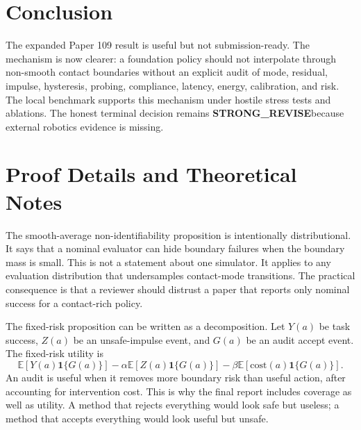 \documentclass{article}
\newcommand{\terminal}{\textbf{STRONG\_REVISE}}
\begin{document}
\section{Conclusion}
The expanded Paper 109 result is useful but not submission-ready. The mechanism is now clearer: a foundation policy should not interpolate through non-smooth contact boundaries without an explicit audit of mode, residual, impulse, hysteresis, probing, compliance, latency, energy, calibration, and risk. The local benchmark supports this mechanism under hostile stress tests and ablations. The honest terminal decision remains \terminal because external robotics evidence is missing.

\clearpage
\appendix
\section{Proof Details and Theoretical Notes}
The smooth-average non-identifiability proposition is intentionally distributional. It says that a nominal evaluator can hide boundary failures when the boundary mass is small. This is not a statement about one simulator. It applies to any evaluation distribution that undersamples contact-mode transitions. The practical consequence is that a reviewer should distrust a paper that reports only nominal success for a contact-rich policy.

The fixed-risk proposition can be written as a decomposition. Let $Y(a)$ be task success, $Z(a)$ be an unsafe-impulse event, and $G(a)$ be an audit accept event. The fixed-risk utility is
\[
  \mathbb{E}[Y(a)\mathbf{1}\{G(a)\}] - \alpha \mathbb{E}[Z(a)\mathbf{1}\{G(a)\}] - \beta \mathbb{E}[\mathrm{cost}(a)\mathbf{1}\{G(a)\}].
\]
An audit is useful when it removes more boundary risk than useful action, after accounting for intervention cost. This is why the final report includes coverage as well as utility. A method that rejects everything would look safe but useless; a method that accepts everything would look useful but unsafe.
\end{document}
